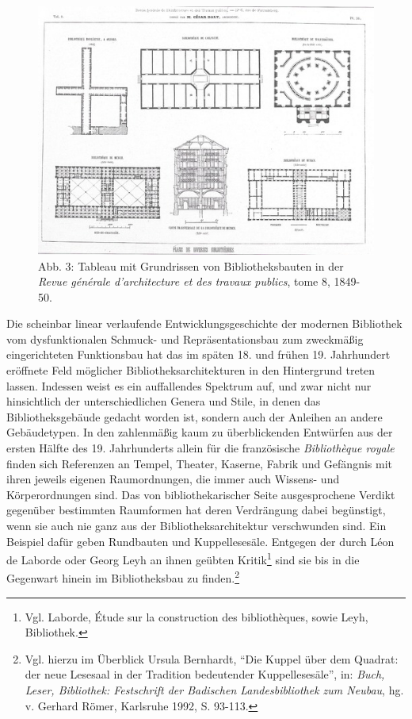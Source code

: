 \begin{figure}[htbp]
\centering
\includegraphics{img/wagner-3.jpg}
\caption{Abb. 3: Tableau mit Grundrissen von Bibliotheksbauten in der
\emph{Revue générale d'architecture et des travaux publics}, tome 8,
1849-50.}
\end{figure}

Die scheinbar linear verlaufende Entwicklungsgeschichte der modernen
Bibliothek vom dysfunktionalen Schmuck- und Repräsentationsbau zum
zweckmäßig eingerichteten Funktionsbau hat das im späten 18. und frühen
19. Jahrhundert eröffnete Feld möglicher Bibliotheksarchitekturen in den
Hintergrund treten lassen. Indessen weist es ein auffallendes Spektrum
auf, und zwar nicht nur hinsichtlich der unterschiedlichen Genera und
Stile, in denen das Bibliotheksgebäude gedacht worden ist, sondern auch
der Anleihen an andere Gebäudetypen. In den zahlenmäßig kaum zu
überblickenden Entwürfen aus der ersten Hälfte des 19. Jahrhunderts
allein für die französische \emph{Bibliothèque royale} finden sich
Referenzen an Tempel, Theater, Kaserne, Fabrik und Gefängnis mit ihren
jeweils eigenen Raumordnungen, die immer auch Wissens- und
Körperordnungen sind. Das von bibliothekarischer Seite ausgesprochene
Verdikt gegenüber bestimmten Raumformen hat deren Verdrängung dabei
begünstigt, wenn sie auch nie ganz aus der Bibliotheksarchitektur
verschwunden sind. Ein Beispiel dafür geben Rundbauten und
Kuppellesesäle. Entgegen der durch Léon de Laborde oder Georg Leyh an
ihnen geübten Kritik\footnote{Vgl. Laborde, Étude sur la construction
  des bibliothèques, sowie Leyh, Bibliothek.} sind sie bis in die
Gegenwart hinein im Bibliotheksbau zu finden.\footnote{Vgl. hierzu im
  Überblick Ursula Bernhardt, \enquote{Die Kuppel über dem Quadrat: der
  neue Lesesaal in der Tradition bedeutender Kuppellesesäle}, in:
  \emph{Buch, Leser, Bibliothek: Festschrift der Badischen
  Landesbibliothek zum Neubau}, hg. v. Gerhard Römer, Karlsruhe 1992, S.
  93-113.}

